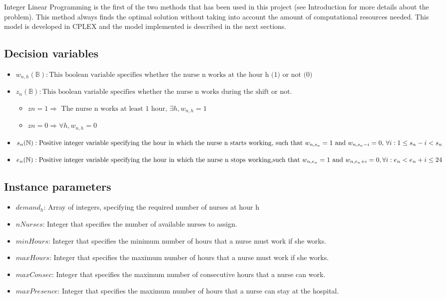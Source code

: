 Integer Linear Programming is the first of the two methods that has been used in this project (see Introduction for more details about the problem). This method always finds the optimal solution without taking into account the amount of computational
resources needed. This model is developed in CPLEX and the model implemented is described in the next sections.


\subsection{Decision variables}

\begin{itemize}

\item $ w_{n,h} (\mathbb{B})  : \text{This boolean variable specifies whether the nurse n works at the hour h (1) or not (0)}  $
\item $ z_{n} (\mathbb{B})  : \text{This boolean variable specifies whether the nurse n works during the shift or not.} $ 
	\begin{itemize}[label=$\star$]
 	\item $ z{n} = 1  \Rightarrow \text{ The nurse n works at least 1 hour, } \exists h, w_{n,h} = 1 $ 
 	\item $ z{n} = 0 \Rightarrow \forall h, w_{n,h} = 0 $ 
 	\end{itemize}
\item $  s_{n} (\mathbb{N}) : \text{Positive integer variable specifying the hour in which the nurse n starts working,} \\ \text{  such that $ w_{n,s_{n}}=1 $ and  $ w_{n,s_{n}-i}=0 $,  $ \forall i: 1 \leq s_{n} - i < s_{n} $ } $
\item $  e_{n} (\mathbb{N}) : \text{Positive integer variable specifying the hour in which the nurse n stops working,} \\ \text{such that $ w_{n,e_{n}}=1 $ and  $ w_{n,e_{n}+i}=0,\forall i : e_{n} < e_{n}+i \leq 24 $  } $
\end{itemize}

\subsection{Instance parameters}

\begin{itemize}
\item  $ demand_h $: Array of integers, specifying the required number of nurses at hour h
\item  $ nNurses $: Integer that specifies the number of available nurses to assign.
\item  $minHours$: Integer that specifies the minimum number of hours that a nurse must work if she works.
\item  $maxHours$: Integer that specifies the maximum number of hours that a nurse must work if she works.
\item  $maxConsec$: Integer that specifies the maximum number of consecutive hours that a nurse can work.
\item  $maxPresence$: Integer that specifies the maximum number of hours that a nurse can stay at the hospital.
\end{itemize}

